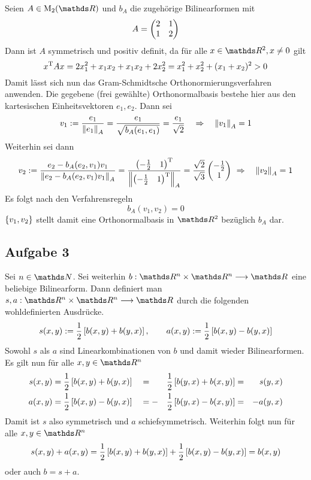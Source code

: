 			Seien $A\in\m{M}_2(\SR)$ und $b_A$ die zugehörige Bilinearformen mit
			\[
				A = \left( 
					\begin{matrix}
						2 & 1 \\ 1 & 2
					\end{matrix}	
				 \right)
			\]
			Dann ist $A$ symmetrisch und positiv definit, da für alle $x\in\SR^2, x\neq 0$ gilt
			\[ x^{\mathrm{T}}Ax = 2x_1^2 + x_1x_2 + x_1x_2 + 2x_2^2 = x_1^2 + x_2^2 + (x_1+x_2)^2 > 0 \]
			Damit lässt sich nun das Gram-Schmidtsche Orthonormierungsverfahren anwenden.
			Die gegebene (frei gewählte) Orthonormalbasis bestehe hier aus den kartesischen Einheitsvektoren $e_1,e_2$.
			Dann sei
			\[ v_1 := \frac{e_1}{\left\| e_1 \right\|_A} = \frac{e_1}{\sqrt{b_A(e_1,e_1)}} = \frac{e_1}{\sqrt{2}} \quad \Rightarrow \quad \left\| v_1 \right\|_A = 1 \]
			Weiterhin sei dann
			\[ v_2 := \frac{e_2 - b_A(e_2,v_1)v_1}{\norm{e_2 - b_A(e_2,v_1)v_1}_A} = \frac{\curvb{-\frac{1}{2} \quad 1}^\m{T}}{\norm{\curvb{-\frac{1}{2} \quad 1}^\m{T}}_A} = \frac{\sqrt{2}}{\sqrt{3}} \begin{pmatrix}-\frac{1}{2}\\1\end{pmatrix} \ \Rightarrow \quad \norm{v_2}_A=1 \]
			Es folgt nach den Verfahrensregeln
			\[ b_A(v_1,v_2) = 0 \]
			$\left\{ v_1,v_2 \right\}$ stellt damit eine Orthonormalbasis in $\SR^2$ bezüglich $b_A$ dar.



		\subsection*{Aufgabe 3} %
		\label{sub:aufgabe_3}
		
			Sei $n\in\SN$.
			Sei weiterhin $b:\SR^n\times\SR^n\longrightarrow\SR$ eine beliebige Bilinearform.
			Dann definiert man $s,a:\SR^n\times\SR^n\longrightarrow\SR$ durch die folgenden wohldefinierten Ausdrücke.
			\[ s(x,y):=\frac{1}{2}\left[ b(x,y) + b(y,x) \right] ,\qquad a(x,y):=\frac{1}{2}\left[ b(x,y)-b(y,x) \right] \]
			Sowohl $s$ als $a$ sind Linearkombinationen von $b$ und damit wieder Bilinearformen.
			Es gilt nun für alle $x,y\in\SR^n$
			\begin{alignat*}{4}
				s(x,y) &= \frac{1}{2}\left[ b(x,y) + b(y,x) \right] &&= &\frac{1}{2}\left[ b(y,x) + b(x,y) \right] &=& s(y,x) \\
				a(x,y) &= \frac{1}{2}\left[ b(x,y) - b(y,x) \right] &&= -&\frac{1}{2}\left[ b(y,x) - b(x,y) \right] &=& -a(y,x)
			\end{alignat*}
			Damit ist $s$ also symmetrisch und $a$ schiefsymmetrisch.
			Weiterhin folgt nun für alle $x,y\in\SR^n$
			\[ s(x,y) + a(x,y) = \frac{1}{2}\left[ b(x,y) + b(y,x) \right] + \frac{1}{2}\left[ b(x,y) - b(y,x) \right] = b(x,y) \]
			oder auch $b=s+a$. \qedbox

